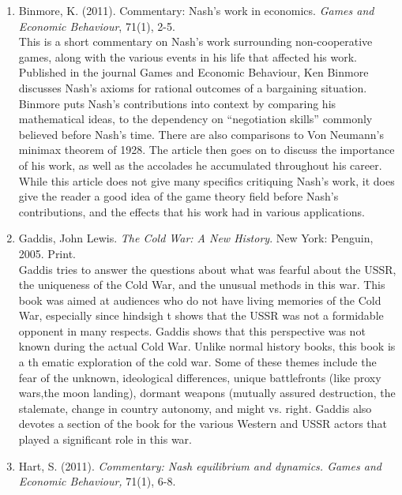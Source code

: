 \documentclass[11pt]{article}
\begin{document}
\begin{enumerate}

\item Binmore, K. (2011). Commentary: Nash's work in economics. \textit{Games and Economic Behaviour}, 71(1), 2-5.\\

This is a short commentary on Nash’s work surrounding non-cooperative games, along with the various events in his life that affected his work. Published in the journal Games and Economic Behaviour, Ken Binmore discusses Nash’s axioms for rational outcomes of a bargaining situation. Binmore puts Nash’s contributions into context by comparing his mathematical ideas, to the dependency on “negotiation skills” commonly believed before Nash’s time. There are also comparisons to Von Neumann’s minimax theorem of 1928. The article then goes on to discuss the importance of his work, as well as the accolades he accumulated throughout his career. While this article does not give many specifics critiquing Nash’s work, it does give the reader a good idea of the game theory field before Nash’s contributions, and the effects that his work had in various applications.\\

\item Gaddis, John Lewis.  \textit{The Cold War: A New History}. New York: Penguin, 2005. Print.\\
 
Gaddis tries to answer the questions about what was fearful about the USSR, the uniqueness of the Cold War, and the unusual methods in this war. This book was aimed at audiences who do not have living memories of the Cold War, especially since hindsigh
t shows that the USSR was not a formidable opponent in many respects. Gaddis shows that this perspective was not known during the actual Cold War. Unlike normal history books, this book is a th
ematic exploration of the cold war. Some of these themes include the fear of the unknown, ideological differences, unique battlefronts (like proxy wars,the moon landing), dormant weapons (mutually assured destruction, the stalemate, change in country 
autonomy, and might vs. right. Gaddis also devotes a section of the book for the various Western and USSR actors that played a significant role in this war.\\

\item Hart, S. (2011). \textit{Commentary: Nash equilibrium and dynamics. Games and Economic Behaviour,} 71(1), 6-8.\\


\end{enumerate}
\end{document}

